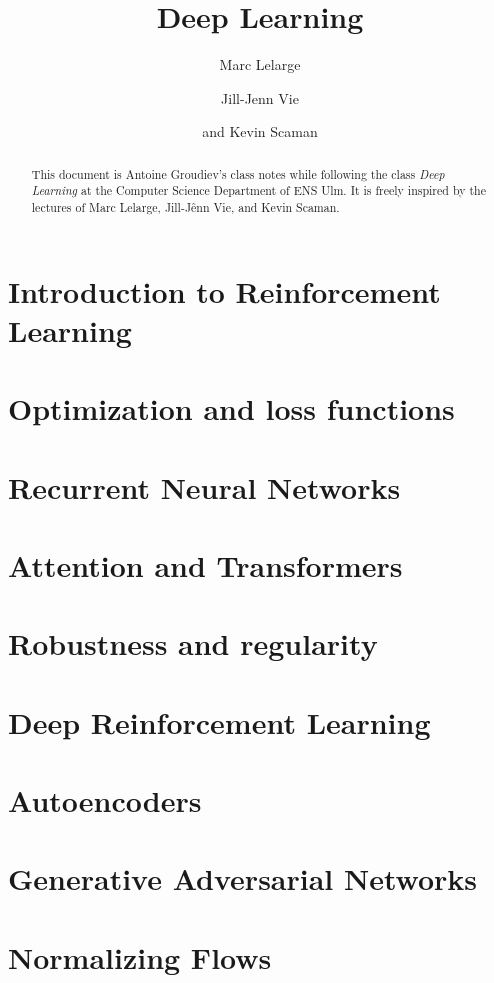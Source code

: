 \documentclass[toc, titlepaged]{../cs-classes/cs-classes}
\title{Deep Learning}
\author{Marc Lelarge\and Jill-Jenn Vie\and and Kevin Scaman}
\begin{document}
\begin{abstract}
    This document is Antoine Groudiev's class notes while following the class \emph{Deep Learning} at the Computer Science Department of ENS Ulm. It is freely inspired by the lectures of Marc Lelarge, Jill-Jênn Vie, and Kevin Scaman. 
\end{abstract}



\newpage

\newpage

\section{Introduction to Reinforcement Learning}

\section{Optimization and loss functions}



\section{Recurrent Neural Networks}

\section{Attention and Transformers}

\section{Robustness and regularity}

\section{Deep Reinforcement Learning}

\section{Autoencoders}

\section{Generative Adversarial Networks}

\section{Normalizing Flows}
\end{document}
